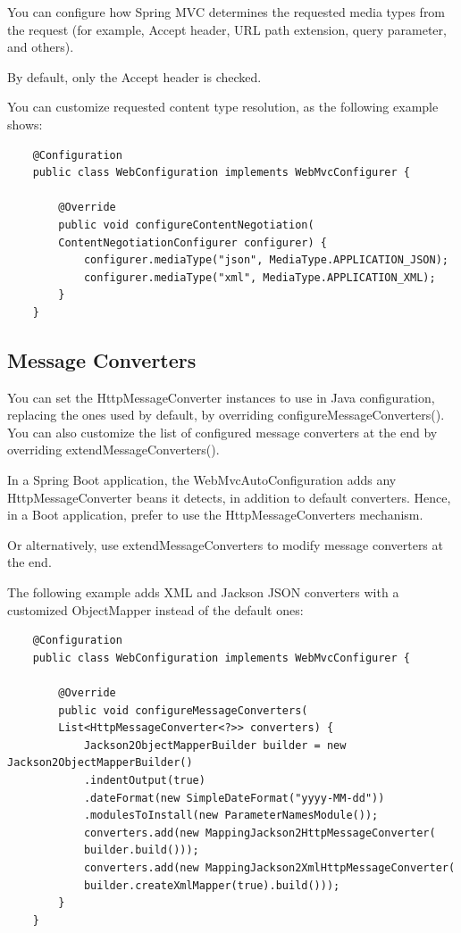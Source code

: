 \documentclass{scrartcl}
\begin{document}
You can configure how Spring MVC determines the requested media types from the request (for example, Accept header, URL path extension, query parameter, and others).

By default, only the Accept header is checked.

You can customize requested content type resolution, as the following example shows:

\begin{lstlisting}
    @Configuration
    public class WebConfiguration implements WebMvcConfigurer {

        @Override
        public void configureContentNegotiation(
        ContentNegotiationConfigurer configurer) {
            configurer.mediaType("json", MediaType.APPLICATION_JSON);
            configurer.mediaType("xml", MediaType.APPLICATION_XML);
        }
    }
\end{lstlisting}

\subsection{Message Converters}

You can set the HttpMessageConverter instances to use in Java configuration, replacing the ones used by default, by overriding configureMessageConverters(). You can also customize the list of configured message converters at the end by overriding extendMessageConverters().

In a Spring Boot application, the WebMvcAutoConfiguration adds any HttpMessageConverter beans it detects, in addition to default converters. Hence, in a Boot application, prefer to use the HttpMessageConverters mechanism.

Or alternatively, use extendMessageConverters to modify message converters at the end.

The following example adds XML and Jackson JSON converters with a customized ObjectMapper instead of the default ones:

\begin{lstlisting}
    @Configuration
    public class WebConfiguration implements WebMvcConfigurer {

        @Override
        public void configureMessageConverters(
        List<HttpMessageConverter<?>> converters) {
            Jackson2ObjectMapperBuilder builder = new Jackson2ObjectMapperBuilder()
            .indentOutput(true)
            .dateFormat(new SimpleDateFormat("yyyy-MM-dd"))
            .modulesToInstall(new ParameterNamesModule());
            converters.add(new MappingJackson2HttpMessageConverter(
            builder.build()));
            converters.add(new MappingJackson2XmlHttpMessageConverter(
            builder.createXmlMapper(true).build()));
        }
    }
\end{lstlisting}
\end{document}
